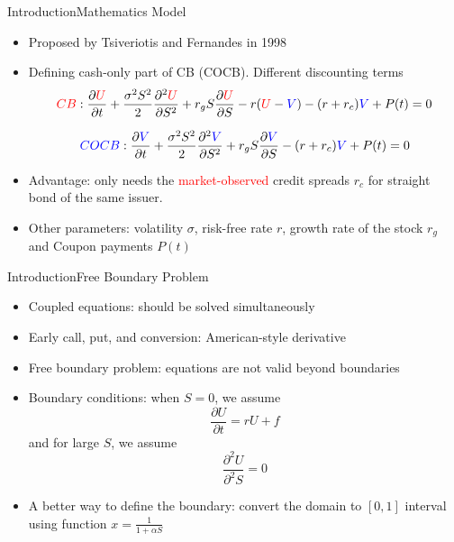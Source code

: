 \documentclass{beamer}
\begin{document}
\begin{frame}[shrink=10] {Introduction}{Mathematics Model}
	\begin{itemize}
		\item Proposed by Tsiveriotis and Fernandes in 1998
		\item Defining cash-only part of CB (COCB). Different discounting terms
\begin{equation*}
\textcolor{red}{CB}: \frac{\partial{\textcolor{red}{U}}}{\partial{t}} + 
\frac{\sigma^2S^2}{2}\frac{\partial^2{\textcolor{red}{U}}}{\partial{S}^2} + r_gS\frac{\partial{\textcolor{red}{U}}}{\partial{S}} - r(\textcolor{red}{U}-\textcolor{blue}{V}) - (r+r_c)\textcolor{blue}{V} + P(t) = 0 
\label{eq:CB}
\end{equation*}

\begin{equation*}
\textcolor{blue}{COCB}: \frac{\partial{\textcolor{blue}{V}}}{\partial{t}} + 
\frac{\sigma^2S^2}{2}\frac{\partial^2{\textcolor{blue}{V}}}{\partial{S}^2} + r_gS\frac{\partial{\textcolor{blue}{V}}}{\partial{S}} - (r+r_c)\textcolor{blue}{V} + P(t) = 0 
\label{eq:COCB}
\end{equation*}
	\item Advantage: only needs the \textcolor{red}{market-observed} credit spreads $r_c$ for straight bond of the same issuer.
	\item Other parameters: volatility $\sigma$, risk-free rate $r$, growth rate of the stock $r_g$ and Coupon payments $P(t)$  
	\end{itemize}
\end{frame}

\begin{frame} {Introduction}{Free Boundary Problem}
	\begin{itemize}
		\item Coupled equations: should be solved simultaneously
		\item Early call, put, and conversion: American-style derivative
		\item Free boundary problem: equations are not valid beyond boundaries
		\item Boundary conditions: when $S = 0$, we assume
		\begin{equation*}
		\frac{\partial U}{\partial t} = rU + f
		\end{equation*}
		and for large $S$, we assume
		\begin{equation*}
		\frac{\partial^2 U}{\partial^2 S} = 0
		\end{equation*}
		\item A better way to define the boundary: convert the domain to $[0, 1]$ interval using function 
		$x = \frac{1}{1+\alpha S}$
	\end{itemize}
\end{frame}
\end{document}

